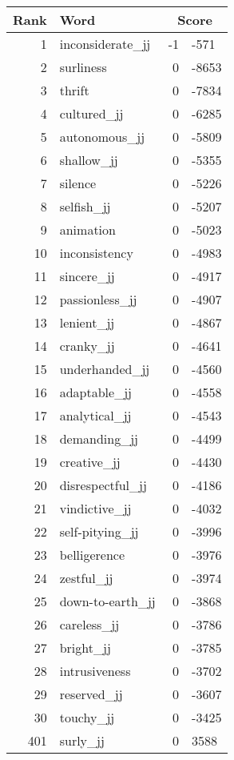\begin{longtable}[!htbp]{| rlr@{.}l |}
    \hline
    \textbf{Rank} & \textbf{Word} & \multicolumn{2}{c|}{\textbf{Score}} \\
    \hline
    \endhead
    1 & inconsiderate\_jj & -1 & -571 \\
    2 & surliness & 0 & -8653 \\
    3 & thrift & 0 & -7834 \\
    4 & cultured\_jj & 0 & -6285 \\
    5 & autonomous\_jj & 0 & -5809 \\
    6 & shallow\_jj & 0 & -5355 \\
    7 & silence & 0 & -5226 \\
    8 & selfish\_jj & 0 & -5207 \\
    9 & animation & 0 & -5023 \\
    10 & inconsistency & 0 & -4983 \\
    11 & sincere\_jj & 0 & -4917 \\
    12 & passionless\_jj & 0 & -4907 \\
    13 & lenient\_jj & 0 & -4867 \\
    14 & cranky\_jj & 0 & -4641 \\
    15 & underhanded\_jj & 0 & -4560 \\
    16 & adaptable\_jj & 0 & -4558 \\
    17 & analytical\_jj & 0 & -4543 \\
    18 & demanding\_jj & 0 & -4499 \\
    19 & creative\_jj & 0 & -4430 \\
    20 & disrespectful\_jj & 0 & -4186 \\
    21 & vindictive\_jj & 0 & -4032 \\
    22 & self-pitying\_jj & 0 & -3996 \\
    23 & belligerence & 0 & -3976 \\
    24 & zestful\_jj & 0 & -3974 \\
    25 & down-to-earth\_jj & 0 & -3868 \\
    26 & careless\_jj & 0 & -3786 \\
    27 & bright\_jj & 0 & -3785 \\
    28 & intrusiveness & 0 & -3702 \\
    29 & reserved\_jj & 0 & -3607 \\
    30 & touchy\_jj & 0 & -3425 \\
    401 & surly\_jj & 0 & 3588 \\

\end{longtable}
